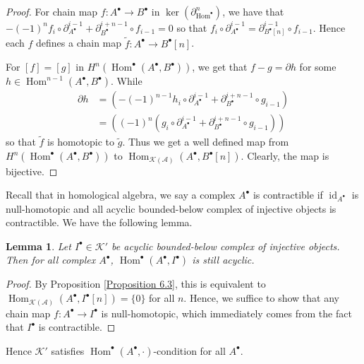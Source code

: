 \documentclass{ctexart}
\newtheorem{lemma}{Lemma}[section]
\renewcommand{\hom}{\operatorname{Hom}}
\newcommand{\identity}{\operatorname{id}}
\begin{document}
\begin{proof}
    For chain map $f: A^{\bullet} \rightarrow B^{\bullet}$ in $\ker (\partial_{\hom^{\bullet}}^{n})$,
    we have that $-(-1)^{n}f_{i} \circ \partial_{A^{\bullet}}^{i - 1} + \partial_{B^{\bullet}}^{i + n - 1} \circ f_{i - 1} = 0$ so that $f_{i} \circ \partial_{A^{\bullet}}^{i - 1} = \partial_{B^{\bullet}[n]}^{i - 1} \circ f_{i - 1}$.
    Hence each $f$ defines a chain map $\widetilde{f}: A^{\bullet} \rightarrow B^{\bullet}[n]$.
    \par
    For $[f] = [g]$ in $H^{n}(\hom^{\bullet}(A^{\bullet}, B^{\bullet}))$,
    we get that $f - g = \partial h$ for some $h\in \hom^{n - 1}(A^{\bullet}, B^{\bullet})$.
    While 
    \begin{equation}
        \begin{split}
            \partial h & = (-(-1)^{n - 1}h_{i} \circ \partial_{A^{\bullet}}^{i - 1} + \partial_{B^{\bullet}}^{i + n - 1} \circ g_{i - 1}) \\
            & = ((-1)^{n}(g_{i} \circ \partial_{A^{\bullet}}^{i - 1} + \partial_{B^{\bullet}}^{i + n - 1} \circ g_{i - 1}))
        \end{split}
    \end{equation}
    so that $\widetilde{f}$ is homotopic to $\widetilde{g}$.
    Thus we get a well defined map from $H^{n}(\hom^{\bullet}(A^{\bullet}, B^{\bullet}))$ to $\hom_{\mathcal{K}(\mathscr{A})}(A^{\bullet}, B^{\bullet}[n])$.
    Clearly, the map is bijective.
\end{proof}
Recall that in homological algebra, we say a complex $A^{\bullet}$ is contractible if $\identity_{A^{\bullet}}$ is null-homotopic and all acyclic bounded-below complex of injective objects is contractible.
We have the following lemma.
\begin{lemma}
    Let $I^{\bullet}\in \mathcal{K}'$ be acyclic bounded-below complex of injective objects.
    Then for all complex $A^{\bullet}$, $\hom^{\bullet}(A^{\bullet}, I^{\bullet})$ is still acyclic.
    \label{Lemma 6.15}
\end{lemma}
\begin{proof}
    By Proposition \ref{Proposition 6.3}, this is equivalent to $\hom_{\mathcal{K}(\mathscr{A})}(A^{\bullet}, I^{\bullet}[n]) = \{0\}$ for all $n$.
    Hence, we suffice to show that any chain map $f: A^{\bullet} \rightarrow I^{\bullet}$ is null-homotopic, 
    which immediately comes from the fact that $I^{\bullet}$ is contractible.
\end{proof}
Hence $\mathcal{K}'$ satisfies $\hom^{\bullet}(A^{\bullet}, \cdot)$-condition for all $A^{\bullet}$.
\end{document}
